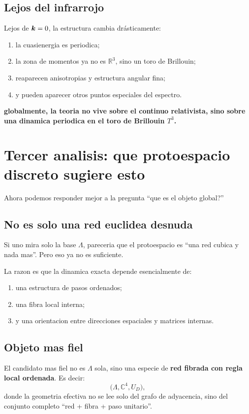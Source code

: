 \subsection{Lejos del infrarrojo}
Lejos de \(\bm{k}=0\), la estructura cambia drásticamente:
\begin{enumerate}[label=\arabic*.]
    \item la cuasienergia es periodica;
    \item la zona de momentos ya no es \(\mathbb{R}^3\), sino un toro de Brillouin;
    \item reaparecen anisotropias y estructura angular fina;
    \item y pueden aparecer otros puntos especiales del espectro.
\end{enumerate}

\begin{displayquote}
\textbf{globalmente, la teoria no vive sobre el continuo relativista, sino sobre una dinamica periodica en el toro de Brillouin \(T^3\).}
\end{displayquote}

\section{Tercer analisis: que protoespacio discreto sugiere esto}
Ahora podemos responder mejor a la pregunta \enquote{que es el objeto global?}

\subsection{No es solo una red euclidea desnuda}
Si uno mira solo la base \(\Lambda\), pareceria que el protoespacio es \enquote{una red cubica y nada mas}. Pero eso ya no es suficiente.

La razon es que la dinamica exacta depende esencialmente de:
\begin{enumerate}[label=\arabic*.]
    \item una estructura de pasos ordenados;
    \item una fibra local interna;
    \item y una orientacion entre direcciones espaciales y matrices internas.
\end{enumerate}

\subsection{Objeto mas fiel}
El candidato mas fiel no es \(\Lambda\) sola, sino una especie de \textbf{red fibrada con regla local ordenada}. Es decir:
\begin{equation}
\bigl(\Lambda,\mathbb{C}^4,U_D\bigr),
\end{equation}
donde la geometria efectiva no se lee solo del grafo de adyacencia, sino del conjunto completo \enquote{red + fibra + paso unitario}.

